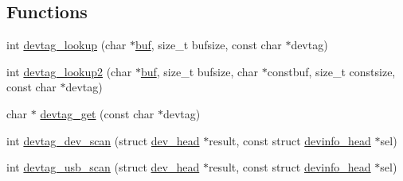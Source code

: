 \subsection*{\-Functions}
\begin{DoxyCompactItemize}
\item 
int \hyperlink{devtag-allinone_8h_aefd4b4d02c6e424b13421afa165ec6ff}{devtag\-\_\-lookup} (char $\ast$\hyperlink{radiotftp_8c_a23a861dc493bd6b8f4542432ff6b6b8c}{buf}, size\-\_\-t bufsize, const char $\ast$devtag)
\item 
int \hyperlink{devtag-allinone_8h_a0e737a3612a611bd8cac59d87e581dac}{devtag\-\_\-lookup2} (char $\ast$\hyperlink{radiotftp_8c_a23a861dc493bd6b8f4542432ff6b6b8c}{buf}, size\-\_\-t bufsize, char $\ast$constbuf, size\-\_\-t constsize, const char $\ast$devtag)
\item 
char $\ast$ \hyperlink{devtag-allinone_8h_ad98ec7a8edb48277eed91a212d3ff528}{devtag\-\_\-get} (const char $\ast$devtag)
\item 
int \hyperlink{devtag-allinone_8h_a6e9cc1f68b141169581043a3db7f53a2}{devtag\-\_\-dev\-\_\-scan} (struct \hyperlink{structdev__head}{dev\-\_\-head} $\ast$result, const struct \hyperlink{structdevinfo__head}{devinfo\-\_\-head} $\ast$sel)
\item 
int \hyperlink{devtag-allinone_8h_a3af117dd76b7f99155371b5d48c72614}{devtag\-\_\-usb\-\_\-scan} (struct \hyperlink{structdev__head}{dev\-\_\-head} $\ast$result, const struct \hyperlink{structdevinfo__head}{devinfo\-\_\-head} $\ast$sel)
\end{DoxyCompactItemize}



